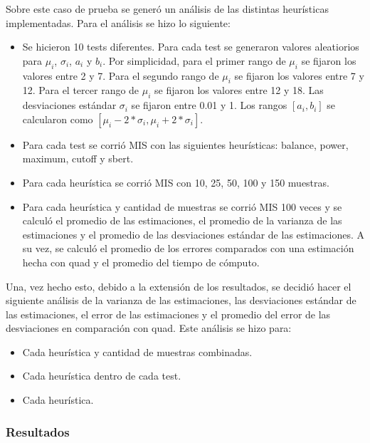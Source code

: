 \documentclass{article}
\begin{document}
Sobre este caso de prueba se generó un análisis de las distintas heurísticas implementadas.
Para el análisis se hizo lo siguiente:
\begin{itemize}
    \item Se hicieron 10 tests diferentes. Para cada test se generaron valores aleatiorios para \( \mu_{i} \), \( \sigma_{i} \), \( a_{i} \) y \( b_{i} \).
          Por simplicidad, para el primer rango de  \( \mu_{i} \) se fijaron los valores entre 2 y 7.
          Para el segundo rango de \( \mu_{i} \) se fijaron los valores entre 7 y 12.
          Para el tercer rango de \( \mu_{i} \) se fijaron los valores entre 12 y 18.
          Las desviaciones estándar \( \sigma_{i} \) se fijaron entre 0.01 y 1.
          Los rangos \( [a_{i}, b_{i}] \) se calcularon como \( [ \mu_{i} - 2 * \sigma_{i}, \mu_{i} + 2 * \sigma_{i} ] \).
    \item Para cada test se corrió MIS con las siguientes heurísticas: balance, power, maximum, cutoff y sbert.
    \item Para cada heurística se corrió MIS con 10, 25, 50, 100 y 150 muestras.
    \item Para cada heurística y cantidad de muestras se corrió MIS 100 veces y se calculó el promedio de las estimaciones,
          el promedio de la varianza de las estimaciones y el promedio de las desviaciones estándar de las estimaciones.
          A su vez, se calculó el promedio de los errores comparados con una estimación hecha con quad y el promedio del tiempo de cómputo.
\end{itemize}

Una, vez hecho esto, debido a la extensión de los resultados, se decidió hacer el siguiente análisis de la varianza de las estimaciones, las desviaciones estándar de las estimaciones, el error de las estimaciones y el promedio del error de las desviaciones en comparación con quad.
Este análisis se hizo para:

\begin{itemize}
    \item Cada heurística y cantidad de muestras combinadas.
    \item Cada heurística dentro de cada test.
    \item Cada heurística.
\end{itemize}

\subsubsection{Resultados}
\end{document}
